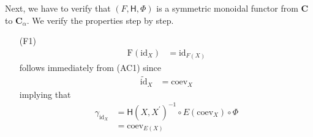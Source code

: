 \begin{prf}[Sketch]
\\\\
Next, we have to verify that $(F,\mathsf{H},\Phi)$ is a symmetric monoidal functor from $\mathbf{C}$ to $\mathbf{C}_{\alpha}$. We verify the properties step by step.
\begin{enumerate}
\item[(F1)]
\begin{align*}
  \mathrm{F}(\mathrm{id}_{X})
  &=
  \mathrm{id}_{F(X)}
\end{align*}
follows immediately from (AC1) since
\begin{align*}
  \widetilde{\mathrm{id}}_{X}
  &=
  \mathrm{coev}_{X}
\end{align*}
implying that
\begin{align*}
  \gamma_{\mathrm{id}_{X}}
  &=
  \mathsf{H}(X,X^{\prime})^{-1}
  \circ
  E(\mathrm{coev}_{X})
  \circ
  \Phi
  \\
  &=
  \mathrm{coev}_{E(X)}
\end{align*}


\end{enumerate}
\end{prf}
